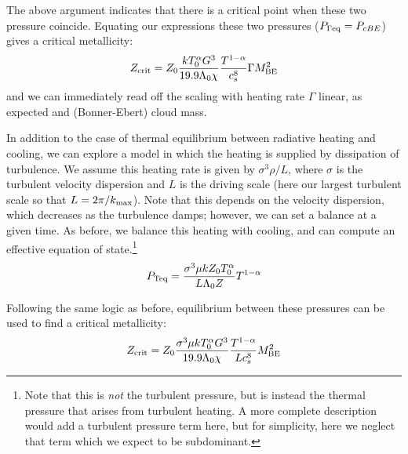 \documentclass[useAMS,usenatbib]{mn2e}
\begin{document}
The above argument indicates that there is a critical point when these two pressure coincide.  Equating our expressions these two pressures ($P_{\Gamma \rm eq} = P_{cBE}$) gives a critical metallicity:
\begin{equation}
Z_{\rm crit} = Z_0 \frac{ k T_0^\alpha G^3}{19.9 \Lambda_0 \chi} \frac{T^{1-\alpha}}{c_s^8} \Gamma M_{\rm BE}^2
\label{eq:crit_zl}
\end{equation}
and we can immediately read off the scaling with heating rate $\Gamma$ linear, as expected and (Bonner-Ebert) cloud mass.

In addition to the case of thermal equilibrium between radiative heating and cooling, we can explore a model in which the heating is supplied by dissipation of turbulence.  We assume this heating rate is given by $\sigma^3 \rho / L$, where $\sigma$ is the turbulent velocity dispersion and $L$ is the driving scale (here our largest turbulent scale so that $L = 2 \pi / k_{\rm max}$).  Note that this depends on the velocity dispersion, which decreases as the turbulence damps; however, we can set a balance at a given time.   As before, we balance this heating with cooling, and can compute an effective equation of state.\footnote{Note that this is {\it not} the turbulent pressure, but is instead the thermal pressure that arises from turbulent heating.  A more complete description would add a turbulent pressure term here, but for simplicity, here we neglect that term which we expect to be subdominant.}
\begin{equation}
P_{\rm Teq} = \frac{\sigma^3 \mu k Z_0 T_0^{\alpha}}{L \Lambda_0 Z} T^{1-\alpha}
\label{eq:Teq}
\end{equation}

Following the same logic as before, equilibrium between these pressures can be used to find a critical metallicity:
\begin{equation}
Z_{\rm crit} = Z_0 \frac{ \sigma^3 \mu k T_0^\alpha G^3}{19.9 \Lambda_0 \chi} \frac{T^{1-\alpha}}{L c_s^8} M_{\rm BE}^2
\label{eq:crit_zt}
\end{equation}
\end{document}
